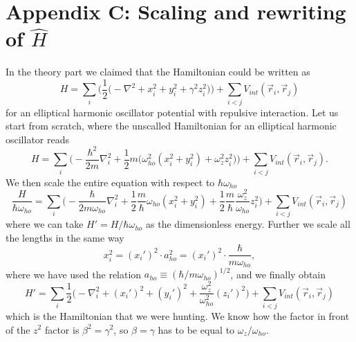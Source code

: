 \documentclass[norsk,a4paper,12pt]{article}
\begin{document}
\section{Appendix C: Scaling and rewriting of $\hat{H}$} \label{sec:appendix_c}
In the theory part we claimed that the Hamiltonian could be written as
\begin{equation}
H=\sum_i\bigg(\frac{1}{2}\Big(-\nabla^2 + x_i^2 + y_i^2 + \gamma^2z_i^2\Big)\bigg)+\sum_{i<j}V_{int}(\vec{r}_i,\vec{r}_j)
\end{equation}
for an elliptical harmonic oscillator potential with repulsive interaction. Let us start from scratch, where the unscalled Hamiltonian for an elliptical harmonic oscillator reads
\begin{equation*}
H=\sum_i\bigg(-\frac{\hbar^2}{2m}\nabla_i^2+\frac{1}{2}m\Big(\omega_{ho}^2(x_i^2+y_i^2)+\omega_z^2z_i^2\Big)\bigg)+\sum_{i<j}V_{int}(\vec{r}_i, \vec{r}_j).
\end{equation*}
We then scale the entire equation with respect to $\hbar\omega_{ho}$
\begin{equation*}
\frac{H}{\hbar\omega_{ho}}=\sum_i\bigg(-\frac{\hbar}{2m\omega_{ho}}\nabla_i^2+\frac{1}{2}\frac{m}{\hbar}\omega_{ho}(x_i^2+y_i^2)+\frac{1}{2}\frac{m}{\hbar}\frac{\omega_z^2}{\omega_{ho}}z_i^2\bigg)+\sum_{i<j}V_{int}(\vec{r}_i, \vec{r}_j)
\end{equation*}
where we can take $H'=H/\hbar\omega_{ho}$ as the dimensionless energy. Further we scale all the lengths in the same way
\begin{equation*}
x_i^2=(x_i')^2\cdot a_{ho}^2=(x_i')^2\cdot\frac{\hbar}{m\omega_{ho}},
\end{equation*}
where we have used the relation $a_{ho}\equiv (\hbar/m\omega_{ho})^{1/2}$, and we finally obtain
\begin{equation}
H'=\sum_i\frac{1}{2}\bigg(-\nabla_i^2+(x_i')^2+(y_i')^2+\frac{\omega_z^2}{\omega_{ho}^2}(z_i')^2\bigg)+\sum_{i<j}V_{int}(\vec{r}_i, \vec{r}_j)
\end{equation}
which is the Hamiltonian that we were hunting. We know how the factor in front of the $z^2$ factor is $\beta^2 = \gamma^2$, so $\beta = \gamma$ has to be equal to $\omega_z/\omega_{ho}$.
\end{document}
